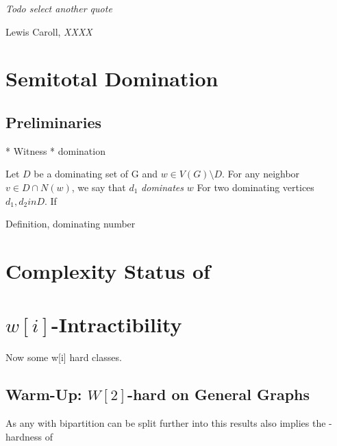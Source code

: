 \epigraph{\itshape Todo select another quote}{Lewis Caroll, \textit{XXXX}}


\section{Semitotal Domination}


\subsection{Preliminaries}

* Witness
* domination 

Let $D$ be a dominating set of G and $w \in V(G) \setminus D$. For any neighbor $v \in D \cap N(w)$, we say that $d_1$ \textit{dominates} $w$ For two dominating vertices $d_1, d_2in D$. If 

\sdom



Definition, dominating number

\section{Complexity Status of \sdom}

\section{\hmath $w[i]$-Intractibility}

Now some w[i] hard classes. 

\subsection{Warm-Up: \hmath $W[2]$-hard on General Graphs}


As any \bg with bipartition can be split further into \rpg this results also implies the \wone-hardness of \rpg

